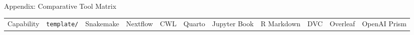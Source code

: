 \documentclass[
  ignorenonframetext,
]{beamer}
\newcounter{none} %
\begin{document}
\begin{frame}{Appendix: Comparative Tool
Matrix}
{\def\LTcaptype{none} %
\begin{longtable}[]{@{}
  >{\raggedright\arraybackslash}p{}
  >{\centering\arraybackslash}p{}
  >{\centering\arraybackslash}p{}
  >{\centering\arraybackslash}p{}
  >{\centering\arraybackslash}p{}
  >{\centering\arraybackslash}p{}
  >{\centering\arraybackslash}p{}
  >{\centering\arraybackslash}p{}
  >{\centering\arraybackslash}p{}
  >{\centering\arraybackslash}p{}
  >{\centering\arraybackslash}p{}@{}}
\toprule\noalign{}
\begin{minipage}[b]{\linewidth}\raggedright
Capability
\end{minipage} & \begin{minipage}[b]{\linewidth}\centering
\texttt{template/}
\end{minipage} & \begin{minipage}[b]{\linewidth}\centering
Snakemake
\end{minipage} & \begin{minipage}[b]{\linewidth}\centering
Nextflow
\end{minipage} & \begin{minipage}[b]{\linewidth}\centering
CWL
\end{minipage} & \begin{minipage}[b]{\linewidth}\centering
Quarto
\end{minipage} & \begin{minipage}[b]{\linewidth}\centering
Jupyter Book
\end{minipage} & \begin{minipage}[b]{\linewidth}\centering
R Markdown
\end{minipage} & \begin{minipage}[b]{\linewidth}\centering
DVC
\end{minipage} & \begin{minipage}[b]{\linewidth}\centering
Overleaf
\end{minipage} & \begin{minipage}[b]{\linewidth}\centering
OpenAI Prism
\end{minipage} \\

\end{longtable}}
\end{frame}
\end{document}
